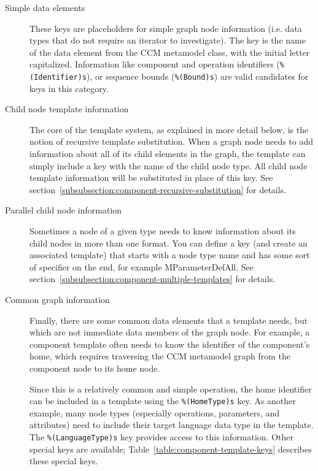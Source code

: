 \begin{description}
\item [Simple data elements] These keys are placeholders for simple graph node
      information (i.e. data types that do not require an iterator to
      investigate). The key is the name of the data element from the CCM
      metamodel class, with the initial letter capitalized. Information like
      component and operation identifiers (\verb+%(Identifier)s+), or sequence
      bounds (\verb+%(Bound)s+) are valid candidates for keys in this category.

\item [Child node template information] The core of the template system, as
      explained in more detail below, is the notion of recursive template
      substitution. When a graph node needs to add information about all of its
      child elements in the graph, the template can simply include a key with
      the name of the child node type. All child node template information will
      be substituted in place of this key. See
      section~\ref{subsubsection:component-recursive-substitution} for details.

\item [Parallel child node information] Sometimes a node of a given type needs
      to know information about its child nodes in more than one format. You can
      define a key (and create an associated template) that starts with a node
      type name and has some sort of specifier on the end, for example
      MParameterDefAll. See
      section~\ref{subsubsection:component-multiple-templates} for details.

\item [Common graph information] Finally, there are some common data elements
      that a template needs, but which are not immediate data members of the
      graph node. For example, a component template often needs to know the
      identifier of the component's home, which requires traversing the CCM
      metamodel graph from the component node to its home node.

      Since this is a relatively common and simple operation, the home
      identifier can be included in a template using the \verb+%(HomeType)s+
      key. As another example, many node types (especially operations,
      parameters, and attributes) need to include their target language data
      type in the template. The \verb+%(LanguageType)s+ key provides access to
      this information. Other special keys are available;
      Table~\ref{table:component-template-keys} describes these special keys.
\end{description}

